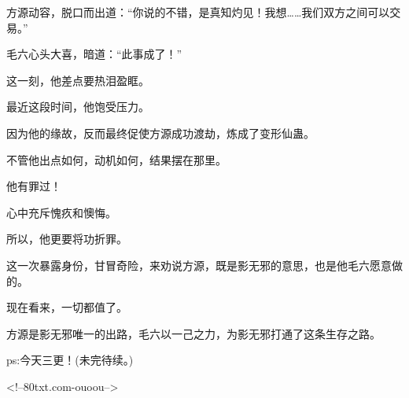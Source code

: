 \begin{this_body}
方源动容，脱口而出道：“你说的不错，是真知灼见！我想……我们双方之间可以交易。”

毛六心头大喜，暗道：“此事成了！”

这一刻，他差点要热泪盈眶。

最近这段时间，他饱受压力。

因为他的缘故，反而最终促使方源成功渡劫，炼成了变形仙蛊。

不管他出点如何，动机如何，结果摆在那里。

他有罪过！

心中充斥愧疚和懊悔。

所以，他更要将功折罪。

这一次暴露身份，甘冒奇险，来劝说方源，既是影无邪的意思，也是他毛六愿意做的。

现在看来，一切都值了。

方源是影无邪唯一的出路，毛六以一己之力，为影无邪打通了这条生存之路。

ps:今天三更！(未完待续。)

<!--80txt.com-ouoou-->

\end{this_body}

